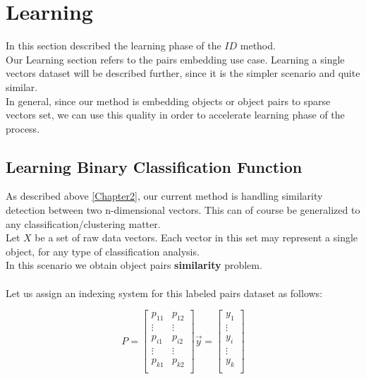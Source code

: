 
\chapter{Learning} %

\label{Chapter5} %


In this section described the learning phase of the $ID$ method.\\
Our Learning section refers to the pairs embedding use case. 
Learning a single vectors dataset will be described further, since it is the simpler scenario and quite similar.\\
In general, since our method is embedding objects or object pairs to sparse vectors set, we can use this quality in order to accelerate learning phase of the process.


\section{Learning Binary Classification Function}

As described above \ref{Chapter2}, our current method is handling similarity detection between two n-dimensional vectors. This can of course be generalized to any classification/clustering matter.
\\
Let $X$ be a set of raw data vectors. Each vector in this set may represent a single object, for any type of classification analysis. 
\\
In this scenario we obtain object pairs \textbf{similarity} problem.
\\ \\Let us assign an indexing system for this labeled pairs dataset as follows:

\begin{equation}
P = \begin{bmatrix}
p_{11} & p_{12}\\ 
 \vdots & \vdots \\ 
p_{i1} & p_{i2}\\ 
 \vdots & \vdots \\ 
p_{k1} & p_{k2}\\ 
\end{bmatrix}
\overrightarrow{y} = \begin{bmatrix}
y_{1} \\ 
 \vdots  \\ 
y_{i} \\ 
 \vdots  \\ 
y_{k} \\ 
\end{bmatrix}
\end{equation}

